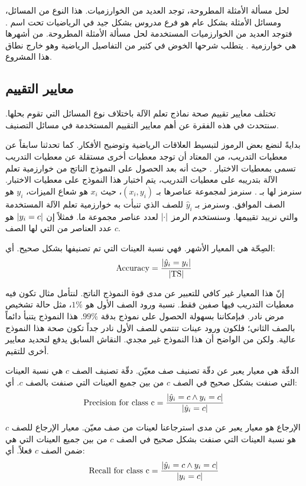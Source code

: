 لحل مسألة الأمثلة المطروحة، توجد العديد من الخوارزميات. هذا النوع من المسائل، ومسائل الأمثلة بشكل عام هو فرع
مدروس بشكل جيد في الرياضيات تحت اسم .
فتوجد العديد من الخوارزميات المستخدمة لحل مسألة الأمثلة المطروحة.
من أشهرها هي خوارزمية
%
. يتطلب شرحها الخوض في كثير من التفاصيل الرياضية وهو خارج نطاق هذا المشروع.

\subsection{معايير التقييم}
تختلف معايير تقييم صحة نماذج تعلم الآلة باختلاف نوع المسائل التي تقوم بحلها.
سنتحدث في هذه الفقرة عن أهم معايير التقييم المستخدمة في مسائل التصنيف.

بدايةً لنضع بعض الرموز لتبسيط العلاقات الرياضية وتوضيح الأفكار.
كما تحدثنا سابقاً عن معطيات التدريب،
من المعتاد أن توجد معطيات أخرى مستقلة عن معطيات التدريب تسمى بمعطيات الاختبار .
حيث أنه بعد الحصول على النموذج الناتج من خوارزمية تعلم الآلة بتدريبه على معطيات التدريب،
يتم اختبار هذا النموذج على معطيات الاختبار.
سنرمز لها بـ .
سنرمز لمجموعة عناصرها بـ $ (x_i, y_i) $، حيث $x_i$ هو شعاع الميزات، $y_i$ هو الصف الموافق.
وسنرمز بـ $\hat{y}_i$ للصف الذي تنبأت به خوارزمية تعلم الآلة المستخدمة والتي نرييد تقييمها.
وسنستخدم الرمز $ \left\vert\cdot\right\vert $ لعدد عناصر مجموعة ما.
فمثلاً إن $ \left\vert y_i = c\right\vert $ هو عدد العناصر من  التي لها الصف $c$.

الصِحّة  هي المعيار الأشهر. فهي نسبة العينات التي تم تصنيفها بشكل صحيح. أي:
$$ \mathrm{Accuracy} = \frac{ \left\vert\hat{y}_i = y_i\right\vert }{ \left\vert \mathrm{TS} \right\vert } $$

إنّ هذا المعيار غير كافي للتعبير عن مدى قوة النموذج الناتج.
لنتأمل مثال تكون فيه معطيات التدريب فيها صفين فقط.
نسبة ورود الصف الأول هو $1\%$،
مثل حالة تشخيص مرض نادر.
فبإمكاننا بسهولة الحصول على نموذج بدقة $99\%$.
هذا النموذج يتنبأ دائماً بالصف الثاني؛
فلكون ورود عينات تنتمي للصف الأول نادر جداً تكون صحة هذا النموذج عالية.
ولكن من الواضح أن هذا النموذج غير مجدي.
النقاش السابق يدفع لتحديد معايير أخرى للتقيم.

الدقّة  هي معيار يعبر عن دقّة تصنيف صف معيّن.
دقّة تصنيف الصف $c$ هي نسبة العينات التي صنفت بشكل صحيح في الصف $c$ من بين جميع العينات التي صنفت بالصف $c$.
أي:
$$ \mathrm{Precision\ for\ class\ c} = \frac{ \left\vert \hat{y}_i = c \wedge y_i = c \right\vert }
{ \left\vert \hat{y}_i = c \right\vert } $$

الإرجاع  هو معيار يعبر عن مدى استرجاعنا لعينات من صف معيّن.
معيار الإرجاع للصف $c$ هو نسبة العينات التي صنفت بشكل صحيح في الصف $c$ من بين جميع العينات التي هي ضمن الصف $c$ فعلاً.
أي:
$$ \mathrm{Recall\ for\ class\ c} =
\frac{ \left\vert \hat{y}_i = c \wedge y_i = c \right\vert }{ \left\vert y_i = c \right\vert } $$

